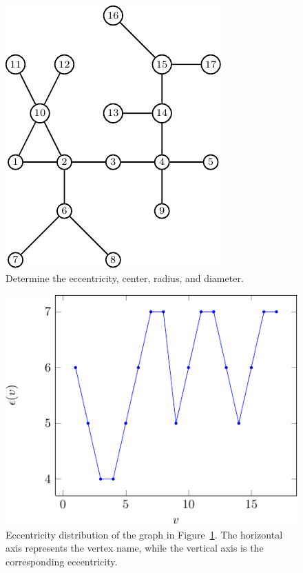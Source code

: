 \begin{figure}[!htbp]
\centering
\includegraphics{image/distance-connectivity/determine-eccentricity-radius-diameter}
\caption{Determine the eccentricity, center, radius, and diameter.}
\label{fig:distance_connectivity:find_eccentricity_center_radius_diameter}
\end{figure}

\begin{table}[!htbp]
\centering
{}

\caption{Eccentricity distribution for the graph in
  Figure~\ref{fig:distance_connectivity:find_eccentricity_center_radius_diameter}.}
\label{tab:distance_connectivity:eccentricity_distribution}
\end{table}

\begin{figure}[!htbp]
\centering
{}
\includegraphics{image/distance-connectivity/eccentricity-distribution}
\caption{Eccentricity distribution of the graph in
  Figure~\ref{fig:distance_connectivity:find_eccentricity_center_radius_diameter}.
  The horizontal axis represents the vertex name, while the vertical
  axis is the corresponding eccentricity.}
\label{fig:distance_connectivity:eccentricity_distribution}
\end{figure}


